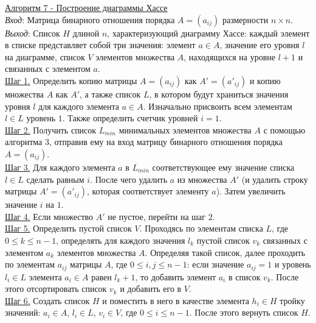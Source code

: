 \documentclass[bachelor, och, labwork]{shiza}
\begin{document}
        \underline{Алгоритм 7 - Построение диаграммы Хассе}\\
            \textit{Вход}: Матрица бинарного отношения порядка $A = (a_{ij})$ размерности $n \times n$.\\
            \textit{Выход}: Список $H$ длиной $n$, характеризующий диаграмму Хассе: каждый элемент в списке представляет
            собой три значения: элемент $a \in A$, значение его уровня $l$ на диаграмме, список $V$ элементов множества
            $A$, находящихся на уровне $l + 1$ и связанных с элементом $a$. \\
            \underline{Шаг 1.} Определить копию матрицы $A = (a_{ij})$ как $A' = (a'_{ij})$ и копию множества $A$ как
            $A'$, а также список $L$, в котором будут храниться значения уровня $l$ для каждого элемента $a \in A$.
            Изначально присвоить всем элементам $l \in L$ уровень $1$. Также определить счетчик уровней $i = 1$.\\
            \underline{Шаг 2.} Получить список $L_{min}$ минимальных элементов множества $A$ с помощью алгоритма 3, отправив ему на вход матрицу бинарного отношения порядка $A = (a_{ij})$.\\
            \underline{Шаг 3.} Для каждого элемента $a$ в $L_{min}$ соответствующее ему значение списка $l \in L$
            сделать равным $i$. После чего удалить $a$ из множества $A'$ (и удалить строку матрицы $A' = (a'_{ij})$,
            которая соответствует элементу $a$). Затем увеличить значение $i$ на $1$.\\
            \underline{Шаг 4.} Если множество $A'$ не пустое, перейти на шаг $2$.\\
            \underline{Шаг 5.} Определить пустой список $V$. Проходясь по элементам списка $L$, где $0 \leq k \leq n -
            1$, определять для каждого значения $l_k$ пустой список $v_k$ связанных с элементом $a_k$ элементов
            множества $A$. Определяя такой список, далее проходить по элементам $a_{ij}$ матрицы $A$, где $0 \leq i, j
            \leq n - 1$: если значение $a_{ij} = 1$ и уровень $l_i \in L$ элемента $a_i \in A$ равен $l_k + 1$, то
            добавить элемент $a_i$ в список $v_k$. После этого отсортировать список $v_k$ и добавить его в $V$. \\
            \underline{Шаг 6.} Создать список $H$ и поместить в него в качестве элемента $h_i \in H$ тройку значений:
            $a_i \in A$, $l_i \in L$, $v_i \in V$, где $0 \leq i \leq n - 1$. После этого вернуть список $H$. \\
\end{document}
